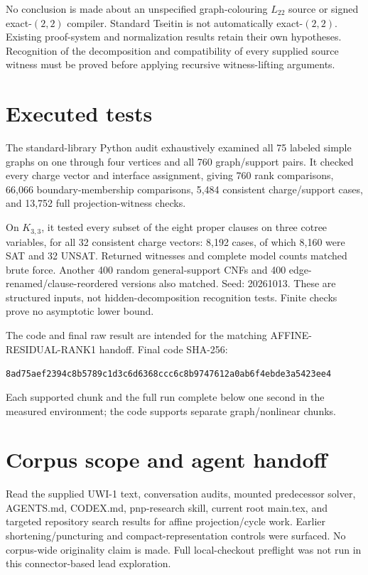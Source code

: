 \documentclass[11pt]{article}
\begin{document}
No conclusion is made about an unspecified graph-colouring $L_{22}$ source or signed exact-$(2,2)$ compiler. Standard Tseitin is not automatically exact-$(2,2)$. Existing proof-system and normalization results retain their own hypotheses. Recognition of the decomposition and compatibility of every supplied source witness must be proved before applying recursive witness-lifting arguments.
\section{Executed tests}
The standard-library Python audit exhaustively examined all 75 labeled simple graphs on one through four vertices and all 760 graph/support pairs. It checked every charge vector and interface assignment, giving 760 rank comparisons, 66,066 boundary-membership comparisons, 5,484 consistent charge/support cases, and 13,752 full projection-witness checks.

On $K_{3,3}$, it tested every subset of the eight proper clauses on three cotree variables, for all 32 consistent charge vectors: 8,192 cases, of which 8,160 were SAT and 32 UNSAT. Returned witnesses and complete model counts matched brute force. Another 400 random general-support CNFs and 400 edge-renamed/clause-reordered versions also matched. Seed: 20261013. These are structured inputs, not hidden-decomposition recognition tests. Finite checks prove no asymptotic lower bound.

The code and final raw result are intended for the matching AFFINE-RESIDUAL-RANK1 handoff. Final code SHA-256:
\begin{center}\small\texttt{8ad75aef2394c8b5789c1d3c6d6368ccc6c8b9747612a0ab6f4ebde3a5423ee4}\end{center}
Each supported chunk and the full run complete below one second in the measured environment; the code supports separate graph/nonlinear chunks.
\section{Corpus scope and agent handoff}
Read the supplied UWI-1 text, conversation audits, mounted predecessor solver, AGENTS.md, CODEX.md, pnp-research skill, current root main.tex, and targeted repository search results for affine projection/cycle work. Earlier shortening/puncturing and compact-representation controls were surfaced. No corpus-wide originality claim is made. Full local-checkout preflight was not run in this connector-based lead exploration.
\end{document}
